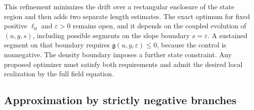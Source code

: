 \documentclass[11pt,a4paper]{article}
\numberwithin{equation}{section}
\theoremstyle{plain}
\theoremstyle{definition}
\theoremstyle{remark}
\newcommand{\ellzero}{\ell_0}
\begin{document}
This refinement minimizes the drift over a rectangular enclosure of the state region and then adds two separate length estimates. The exact optimum for fixed positive $\ellzero$ and $\varepsilon>0$ remains open, and it depends on the coupled evolution of $(u,y,s)$, including possible segments on the slope boundary $s=\varepsilon$. A sustained segment on that boundary requires $\mathfrak g(u,y,\varepsilon)\leqslant 0$, because the control is nonnegative. The density boundary imposes a further state constraint. Any proposed optimizer must satisfy both requirements and admit the desired local realization by the full field equation.

\subsection{Approximation by strictly negative branches}
\end{document}
